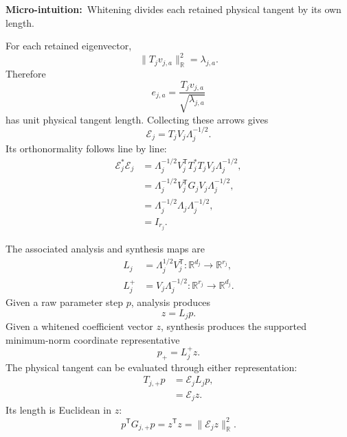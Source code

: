 \documentclass[10pt,twocolumn]{article}
\newcommand{\micro}[1]{\par\noindent\textbf{Micro-intuition:}\ #1\par}
\begin{document}
\micro{Whitening divides each retained physical tangent by its own length.}

For each retained eigenvector,
\begin{equation}
\|T_jv_{j,a}\|_{\mathbb R}^2=\lambda_{j,a}.
\label{eq:bridge-retained-mode-length}
\end{equation}
Therefore
\begin{equation}
e_{j,a}=\frac{T_jv_{j,a}}{\sqrt{\lambda_{j,a}}}
\label{eq:bridge-one-whitened-arrow}
\end{equation}
has unit physical tangent length. Collecting these arrows gives
\begin{equation}
\mathcal E_j
=T_jV_j\Lambda_j^{-1/2}.
\label{eq:bridge-physical-frame}
\end{equation}
Its orthonormality follows line by line:
\begin{align}
\mathcal E_j^*\mathcal E_j
&=\Lambda_j^{-1/2}V_j^{\mathsf T}T_j^*T_j
V_j\Lambda_j^{-1/2},
\label{eq:bridge-frame-proof-1}\\
&=\Lambda_j^{-1/2}V_j^{\mathsf T}G_jV_j
\Lambda_j^{-1/2},
\label{eq:bridge-frame-proof-2}\\
&=\Lambda_j^{-1/2}\Lambda_j\Lambda_j^{-1/2},
\label{eq:bridge-frame-proof-3}\\
&=I_{r_j}.
\label{eq:bridge-frame-proof-4}
\end{align}

The associated analysis and synthesis maps are
\begin{align}
L_j&=\Lambda_j^{1/2}V_j^{\mathsf T}
:\mathbb R^{d_j}\rightarrow\mathbb R^{r_j},
\label{eq:bridge-analysis-map}\\
L_j^+&=V_j\Lambda_j^{-1/2}
:\mathbb R^{r_j}\rightarrow\mathbb R^{d_j}.
\label{eq:bridge-synthesis-map}
\end{align}
Given a raw parameter step \(p\), analysis produces
\begin{equation}
z=L_jp.
\label{eq:bridge-analysis-action}
\end{equation}
Given a whitened coefficient vector \(z\), synthesis produces the supported
minimum-norm coordinate representative
\begin{equation}
p_+=L_j^+z.
\label{eq:bridge-synthesis-action}
\end{equation}
The physical tangent can be evaluated through either representation:
\begin{align}
T_{j,+}p
&=\mathcal E_jL_jp,
\label{eq:bridge-two-route-tangent-1}\\
&=\mathcal E_jz.
\label{eq:bridge-two-route-tangent-2}
\end{align}
Its length is Euclidean in \(z\):
\begin{equation}
p^{\mathsf T}G_{j,+}p
=z^{\mathsf T}z
=\|\mathcal E_jz\|_{\mathbb R}^2.
\label{eq:bridge-euclidean-whitened-length}
\end{equation}
\end{document}
